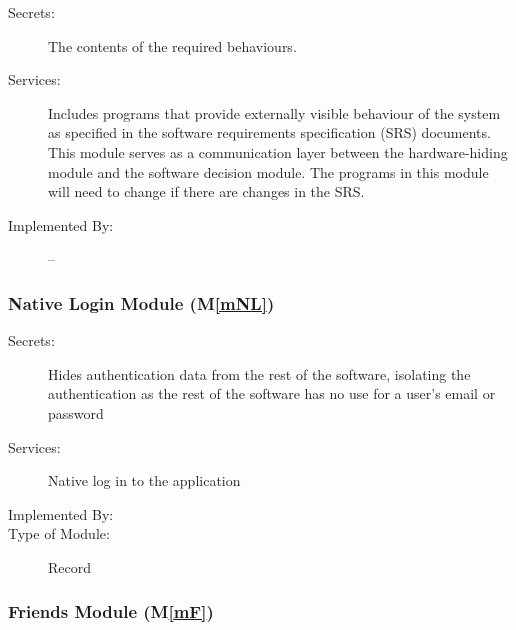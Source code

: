 \documentclass[12pt, titlepage]{article}
\newcommand{\mref}[1]{M\ref{#1}}
\begin{document}
\begin{description}
\item[Secrets:]The contents of the required behaviours.
\item[Services:]Includes programs that provide externally visible behaviour of
  the system as specified in the software requirements specification (SRS)
  documents. This module serves as a communication layer between the
  hardware-hiding module and the software decision module. The programs in this
  module will need to change if there are changes in the SRS.
\item[Implemented By:] --
\end{description}

%

\subsubsection{Native Login Module (\mref{mNL})}

\begin{description}
\item[Secrets:] Hides authentication data from the rest of the software, isolating the authentication as the rest of the software has no use for a user's email or password
\item[Services:] Native log in to the application
\item[Implemented By:] \progname
\item[Type of Module:] Record
\end{description}

\subsubsection{Friends Module (\mref{mF})}
\end{document}

